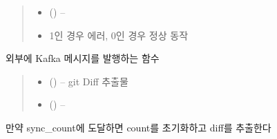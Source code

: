 \documentclass[a4paper,10pt,english]{sphinxmanual}
\begin{document}
\begin{fulllineitems}
\begin{fulllineitems}
\begin{quote}
\begin{description}
\begin{itemize}
\item {} 
\sphinxAtStartPar
{} () – 

\end{itemize}

\sphinxAtStartPar
\begin{itemize}
\item {} 
\sphinxAtStartPar
1인 경우 에러, 0인 경우 정상 동작

\end{itemize}


\end{description}\end{quote}

\end{fulllineitems}


\begin{fulllineitems}
\label{\detokenize{_Session:Session.kafkaProducer}}
\pysigstartsignatures
{}
\pysigstopsignatures
\sphinxAtStartPar
외부에 Kafka 메시지를 발행하는 함수
\begin{quote}\begin{description}
\begin{itemize}
\item {} 
\sphinxAtStartPar
{} () – git Diff 추출물

\item {} 
\sphinxAtStartPar
{} () – 

\end{itemize}

\end{description}\end{quote}

\end{fulllineitems}


\begin{fulllineitems}
\label{\detokenize{_Session:Session.onMaxCount}}
\pysigstartsignatures
{}
\pysigstopsignatures
\sphinxAtStartPar
만약 sync\_count에 도달하면 count를 초기화하고 diff를 추출한다



\end{fulllineitems}
\end{fulllineitems}
\end{document}
